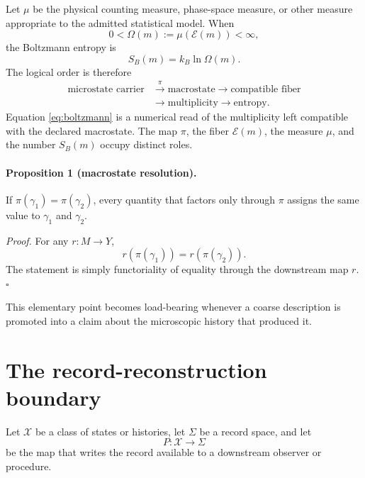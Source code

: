 \documentclass[aps,prd,reprint,nofootinbib,superscriptaddress]{revtex4-2}
\begin{document}
Let $\mu$ be the physical counting measure, phase-space measure, or other measure appropriate to the admitted statistical model. When
\begin{equation}
0<\Omega(m):=\mu(\mathcal E(m))<\infty,
\end{equation}
the Boltzmann entropy is
\begin{equation}
\boxed{S_B(m)=k_B\ln\Omega(m).}
\label{eq:boltzmann}
\end{equation}
The logical order is therefore
\begin{equation}
\begin{aligned}
\text{microstate carrier}
&\xrightarrow{\ \pi\ }
\text{macrostate}
\longrightarrow
\text{compatible fiber}\\
&\longrightarrow
\text{multiplicity}
\longrightarrow
\text{entropy}.
\end{aligned}
\label{eq:chain}
\end{equation}
Equation \eqref{eq:boltzmann} is a numerical read of the multiplicity left compatible with the declared macrostate. The map $\pi$, the fiber $\mathcal E(m)$, the measure $\mu$, and the number $S_B(m)$ occupy distinct roles.

\paragraph{Proposition 1 (macrostate resolution).}
If $\pi(\gamma_1)=\pi(\gamma_2)$, every quantity that factors only through $\pi$ assigns the same value to $\gamma_1$ and $\gamma_2$.

\emph{Proof.}
For any $r:M\to Y$,
\begin{equation}
r(\pi(\gamma_1))=r(\pi(\gamma_2)).
\end{equation}
The statement is simply functoriality of equality through the downstream map $r$. \hfill$\square$

This elementary point becomes load-bearing whenever a coarse description is promoted into a claim about the microscopic history that produced it.

\section{The record-reconstruction boundary}

Let $\mathcal X$ be a class of states or histories, let $\Sigma$ be a record space, and let
\begin{equation}
P:\mathcal X\longrightarrow\Sigma
\label{eq:recordmap}
\end{equation}
be the map that writes the record available to a downstream observer or procedure.
\end{document}
